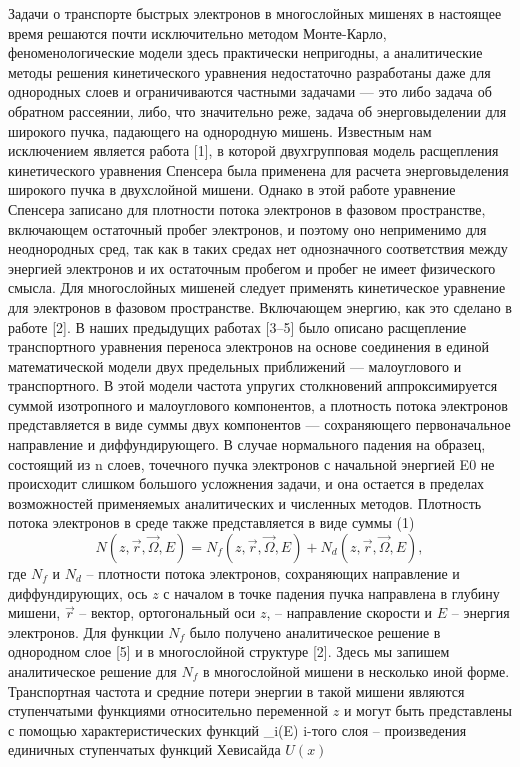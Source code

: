 Задачи о транспорте быстрых электронов в многослойных мишенях в настоящее
время решаются почти исключительно методом Монте-Карло, феноменологические
модели здесь практически непригодны, а аналитические методы решения кинетического
уравнения недостаточно разработаны даже для однородных слоев и ограничиваются
частными задачами — это либо задача об обратном рассеянии, либо, что значительно
реже, задача об энерговыделении для широкого пучка, падающего на однородную
мишень. Известным нам исключением является работа [1], в которой двухгрупповая
модель расщепления кинетического уравнения Спенсера была применена для расчета
энерговыделения широкого пучка в двухслойной мишени. Однако в этой работе
уравнение Спенсера записано для плотности потока электронов в фазовом пространстве,
включающем остаточный пробег электронов, и поэтому оно неприменимо для
неоднородных сред, так как в таких средах нет однозначного соответствия между
энергией электронов и их остаточным пробегом и пробег не имеет физического смысла.
Для многослойных мишеней следует применять кинетическое уравнение для электронов в
фазовом пространстве. Включающем энергию, как это сделано в работе [2].
В наших предыдущих работах [3–5] было описано расщепление транспортного
уравнения переноса электронов на основе соединения в единой математической модели
двух предельных приближений — малоуглового и транспортного. В этой модели частота
упругих столкновений аппроксимируется суммой изотропного и малоуглового
компонентов, а плотность потока электронов представляется в виде суммы двух
компонентов — сохраняющего первоначальное направление и диффундирующего.
В случае нормального падения на образец, состоящий из n слоев, точечного пучка
электронов с начальной энергией E0 не происходит слишком большого усложнения
задачи, и она остается в пределах возможностей применяемых аналитических и
численных методов. Плотность потока электронов в среде также представляется в виде
суммы
(1)
\begin{equation}
N(z,\vec{r},\vec{\Omega},E)=N_f (z,\vec{r},\vec{\Omega},E)+N_d (z,\vec{r},\vec{\Omega},E),
\label{eq:}
\end{equation}
где $N_f$ и $N_d$ – плотности потока электронов, сохраняющих направление и
диффундирующих, ось $z$ с началом в точке падения пучка направлена в глубину мишени,
$\vec{r}$ – вектор, ортогональный оси $z$, \vec{\Omega} – направление скорости и $E$ – энергия электронов.
Для функции $N_f$ было получено аналитическое решение в однородном слое [5] и в
многослойной структуре [2]. Здесь мы запишем аналитическое решение для $N_f$ в
многослойной мишени в несколько иной форме. Транспортная частота и средние потери
энергии в такой мишени являются ступенчатыми функциями относительно переменной $z$
и могут быть представлены с помощью характеристических функций \chi_i(E) i-того слоя –
произведения единичных ступенчатых функций Хевисайда $U(x)$


